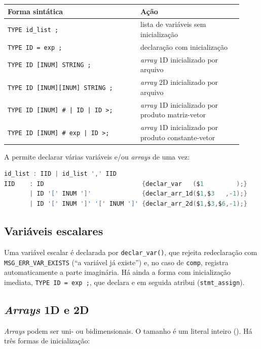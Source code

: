 \begin{longtable}{@{}p{0.52\linewidth}p{0.40\linewidth}@{}}
\toprule
\textbf{Forma sintática} & \textbf{Ação} \\
\midrule
\endhead
\lstinline|TYPE id_list ;| & lista de variáveis sem inicialização \\
\lstinline|TYPE ID = exp ;| & declaração com inicialização \\
\lstinline|TYPE ID [INUM] STRING ;| & \emph{array} 1D inicializado por arquivo \\
\lstinline|TYPE ID [INUM][INUM] STRING ;| & \emph{array} 2D inicializado por arquivo \\
\lstinline+TYPE ID [INUM] # | ID | ID >;+ & \emph{array} 1D inicializado por produto matriz-vetor \\
\lstinline+TYPE ID [INUM] # exp | ID >;+ & \emph{array} 1D inicializado por produto constante-vetor \\
\bottomrule
\end{longtable}

A  permite declarar várias variáveis e/ou \emph{arrays} de uma vez:

\begin{lstlisting}[language=C]
id_list : IID | id_list ',' IID
IID    : ID                           {declar_var   ($1         );}
       | ID '[' INUM ']'              {declar_arr_1d($1,$3   ,-1);}
       | ID '[' INUM ']' '[' INUM ']' {declar_arr_2d($1,$3,$6,-1);}
\end{lstlisting}

\subsection{Variáveis escalares}

Uma variável escalar é declarada por \lstinline|declar_var()|, que rejeita
redeclaração com \lstinline|MSG_ERR_VAR_EXISTS| (\enquote{a variável já existe})
e, no caso de \lstinline|comp|, registra automaticamente a parte imaginária. Há
ainda a forma com inicialização imediata, \lstinline|TYPE ID = exp ;|, que
declara e em seguida atribui (\lstinline|stmt_assign|).

\subsection{\emph{Arrays} 1D e 2D}

\emph{Arrays} podem ser uni- ou bidimensionais. O tamanho é um literal inteiro
(). Há três formas de inicialização:

